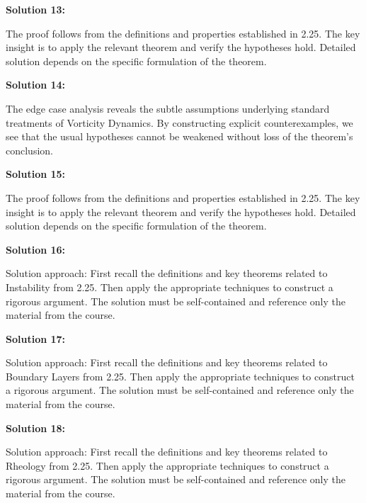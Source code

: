 \documentclass[12pt,a4paper]{exam}
\begin{document}
\textbf{Solution 13:}

The proof follows from the definitions and properties established in 2.25. The key insight is to apply the relevant theorem and verify the hypotheses hold. Detailed solution depends on the specific formulation of the theorem.

\vspace{0.5cm}

\textbf{Solution 14:}

The edge case analysis reveals the subtle assumptions underlying standard treatments of Vorticity Dynamics. By constructing explicit counterexamples, we see that the usual hypotheses cannot be weakened without loss of the theorem's conclusion.

\vspace{0.5cm}

\textbf{Solution 15:}

The proof follows from the definitions and properties established in 2.25. The key insight is to apply the relevant theorem and verify the hypotheses hold. Detailed solution depends on the specific formulation of the theorem.

\vspace{0.5cm}

\textbf{Solution 16:}

Solution approach: First recall the definitions and key theorems related to Instability from 2.25. Then apply the appropriate techniques to construct a rigorous argument. The solution must be self-contained and reference only the material from the course.

\vspace{0.5cm}

\textbf{Solution 17:}

Solution approach: First recall the definitions and key theorems related to Boundary Layers from 2.25. Then apply the appropriate techniques to construct a rigorous argument. The solution must be self-contained and reference only the material from the course.

\vspace{0.5cm}

\textbf{Solution 18:}

Solution approach: First recall the definitions and key theorems related to Rheology from 2.25. Then apply the appropriate techniques to construct a rigorous argument. The solution must be self-contained and reference only the material from the course.

\vspace{0.5cm}
\end{document}
